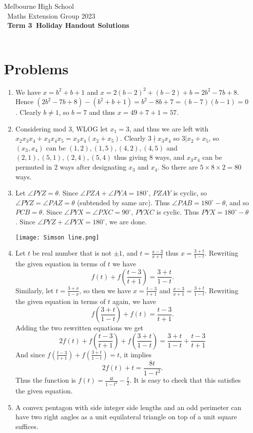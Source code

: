 \documentclass[a4paper]{article}
\title{{\thepdftitle}}
\author{Nathan Wong\and Tom Yan}
\date{2023}
\newcommand{\theterm}{3}
\newcommand{\thedisplaytitle}{Term \theterm\ Holiday Handout Solutions}
\begin{document}
\noindent Melbourne High School\\\
\noindent Maths Extension Group 2023\\\
\noindent \textbf{\thedisplaytitle}\\\
\section*{Problems}
\begin{enumerate}
	\item We have $x=b^2+b+1$ and $x=2(b-2)^2+(b-2)+b=2b^2-7b+8$. Hence $(2b^2-7b+8)-(b^2+b+1)=b^2-8b+7=(b-7)(b-1)=0$. Clearly $b \neq 1$, so $b=7$ and thus $x=49+7+1=57.$
	\item Considering mod 3, WLOG let $x_1 = 3$, and thus we are left with $x_2x_3x_4 + x_3x_4x_5 = x_3x_4(x_2 + x_5).$ Clearly $3 \nmid x_3x_4$ so $3 \vert x_2+x_5$, so $(x_3,x_4)$ can be $(1,2), (1,5), (4,2), (4,5)$ and $(2,1), (5,1), (2,4), (5,4)$ thus giving 8 ways, and $x_3x_4$ can be permuted in $2$ ways after designating $x_3$ and $x_4$. So there are $5 \times 8 \times 2 = 80$ ways.
	\item Let $\angle PYZ = \theta$. Since $\angle PZA + \angle PYA = 180^{\circ}$, $PZAY$ is cyclic, so $\angle PYZ = \angle PAZ = \theta$ (subtended by same arc). Thus $\angle PAB = 180^{\circ} - \theta$, and so $PCB = \theta$. Since $\angle PYX = \angle PXC = 90^{\circ}$, $PYXC$ is cyclic. Thus $PYX = 180^{\circ}-\theta$. Since $\angle PYZ + \angle PYX = 180^{\circ}$, we are done. \\ \centerline{\texttt{[image: Simson line.png]}}
	\item Let $t$ be real number that is not $\pm 1$, and $t=\frac{x-3}{x+1}$ thus $x=\frac{3+t}{1-t}$. Rewriting the given equation in terms of $t$ we have $$f(t)+f(\frac{t-3}{t+1})=\frac{3+t}{1-t}.$$ Similarly, let $t=\frac{3+x}{1-x}$, so then we have $x=\frac{t-3}{t+1}$ and $\frac{x-3}{x+1}=\frac{3+t}{1-t}$. Rewriting the given equation in terms of $t$ again, we have $$f(\frac{3+t}{1-t}) + f(t)=\frac{t-3}{t+1}.$$ Adding the two rewritten equations we get $$2f(t)+f(\frac{t-3}{t+1})+f(\frac{3+t}{1-t})=\frac{3+t}{1-t}+\frac{t-3}{t+1}$$ And since $f(\frac{t-3}{t+1})+f(\frac{3+t}{1-t})=t$, it implies $$2f(t)+t=\frac{8t}{1-t^2}.$$ Thus the function is $f(t)=\frac{4t}{1-t^2}-\frac{t}{2}$. It is easy to check that this satisfies the given equation. 
	\item A convex pentagon with side integer side lengths and an odd perimeter can have two right angles as a unit equilateral triangle on top of a unit square suffices. 


\end{enumerate}
\end{document}
